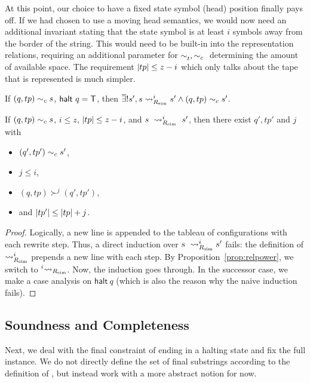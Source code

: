\begin{remark}
  At this point, our choice to have a fixed state symbol (head) position finally pays off. If we had chosen to use a moving head semantics, we would now need an additional invariant stating that the state symbol is at least $i$ symbols away from the border of the string. This would need to be built-in into the representation relations, requiring an additional parameter for $\sim_t^{}, \sim_c{}$ determining the amount of available space.
  The requirement $|tp| \le z - i$ which only talks about the tape that is represented is much simpler.
\end{remark}

\begin{lemma}\label{lem:multistep_halt}
  If $(q, tp) \sim_c{} s$, $\textsf{halt}~q = \mathsf{T}$, then $\overline{\exists}! s', s \rightsquigarrow_{R_{\text{sim}}}^i s' \land (q, tp) \sim_c{} s'$. 
\end{lemma}

\begin{lemma}\label{lem:multistep_sound}
  If $(q, tp) \sim_c{} s$, $i \le z$, $|tp| \le z - i$, and $s~\rightsquigarrow_{R_{\text{sim}}}^i~s'$, then there exist $q', tp'$ and $j$ with 
  \begin{itemize}
    \item $(q', tp') \sim_c{} s'$, 
    \item $j \le i$, 
    \item $(q, tp) \succ^j (q', tp')$, 
    \item and $|tp'| \le |tp| + j$.
  \end{itemize}
\end{lemma}
\begin{proof}
  Logically, a new line is appended to the tableau of configurations with each rewrite step. Thus, a direct induction over $s~\rightsquigarrow_{R_{\text{sim}}}^i s'$ fails: the definition of $\rightsquigarrow_{R_{\text{sim}}}^i$ prepends a new line with each step. By Proposition~\ref{prop:relpower}, we switch to $\prescript{i}{}{\rightsquigarrow_{\ensuremath{R_{\text{sim}}}}}$. 
  Now, the induction goes through. In the successor case, we make a case analysis on $\textsf{halt}~q$ (which is also the reason why the naive induction fails).
\end{proof}

\subsection{Soundness and Completeness}
Next, we deal with the final constraint of ending in a halting state and fix the full \PR{} instance.
We do not directly define the set of final substrings according to the definition of \PR{}, but instead work with a more abstract notion for now.

